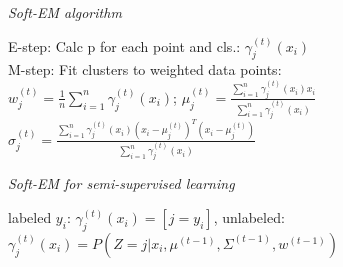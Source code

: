 \emph{Soft-EM algorithm}

E-step: Calc p for each point and cls.: $\gamma_j^{(t)}(x_i)$\\
M-step: Fit clusters to weighted data points:\\
$w_j^{(t)} = \frac{1}{n} \sum_{i=1}^n \gamma_j^{(t)} (x_i)$; 
$\mu_j^{(t)} = \frac{\sum_{i=1}^n \gamma_j^{(t)} (x_i) x_i}{\sum_{i=1}^n \gamma_j^{(t)} (x_i)}$\\
$\sigma_j^{(t)} = \frac{\sum_{i=1}^n \gamma_j^{(t)}(x_i) (x_i - \mu_j^{(t)})^T (x_i - \mu_j^{(t)})}{\sum_{i=1}^n \gamma_j^{(t)}(x_i)}$

\emph{Soft-EM for semi-supervised learning}

labeled $y_i$: $\gamma_j^{(t)}(x_i) = [j = y_i]$,
unlabeled:\\ $\gamma_j^{(t)}(x_i) = P(Z=j|x_i, \mu^{(t-1)}, \Sigma^{(t-1)}, w^{(t-1)})$

\iffalse
\subsection*{Log-likelihood}
$l(\theta) = log P(\mathcal{D})$ \\
$=\sum_{\overset{i=1}{y_i=\times}}^n log P(x_i;\theta) + \sum_{\overset{i=1}{y_i\not=\times}}^n log P(x_i,y_i;\theta)$\\
$=\sum_{\overset{i=1}{y_i=\times}}^n log \sum_{i=1}^m P(x_i, Y=j;\theta) +$\\
$ \sum_{\overset{i=1}{y_i\not=\times}}^n log P(x_i,y_i;\theta)$\\
$=\sum_{\overset{i=1}{y_i=\times}}^n log \sum_{i=1}^m P(x_i|Y=j;\theta)P(Y=j|\theta) +$\\
$ \sum_{\overset{i=1}{y_i\not=\times}}^n log P(x_i,y_i;\theta)$

\subsection*{Latent variable}
We denote the latent variable indicating the component the point is sampled from by Z, which takes on values in $\{1,...,k\}$.

\subsection*{E-step: Posterior probabilities}
$\gamma_j^t(x_i) = P(Z=j|x_i, \theta_t) = \frac{P(x_i|Z=j, \theta_t) P(Z=j|\theta_t)}{P(x_i;\theta_t)}$

\subsection*{M-step: maximizing expected log likelihood}
$\mathbb{E}_{\gamma^t}[\log P(\mathcal{D;\theta})] = 
\mathbb{E}_{\gamma^t}[\log \Pi_{i=1}^nP(x_i,z_i;\theta)] = $ \\
$\sum_{i=1}^n \mathbb{E}_{\gamma^t}[\log P(x_i,z_i;\theta)] = $ \\
$\sum_{i=1}^n \sum_{j=1}^k \gamma_j^t(x_i) \log (P(x_i|z_i=j;\theta) P(z_i=j;\theta))$ \\
$\theta_{t+1} = \underset{\theta}{\operatorname{argmax}} \mathbb{E}_{\gamma^t}[\log P(\mathcal{D;\theta})]$
\fi
